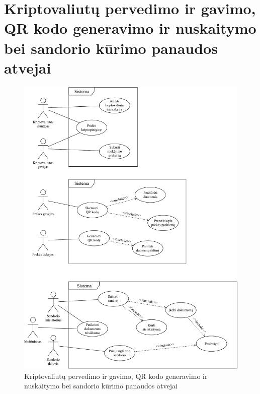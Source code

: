 \section{Kriptovaliutų pervedimo ir gavimo, QR kodo generavimo ir nuskaitymo bei sandorio kūrimo panaudos atvejai}
\begin{figure}[H]
    \centering
    \includegraphics[scale=0.7]{images/ucd-3-4-5}
    \caption{Kriptovaliutų pervedimo ir gavimo, QR kodo generavimo ir nuskaitymo bei sandorio kūrimo panaudos atvejai}
\end{figure}



